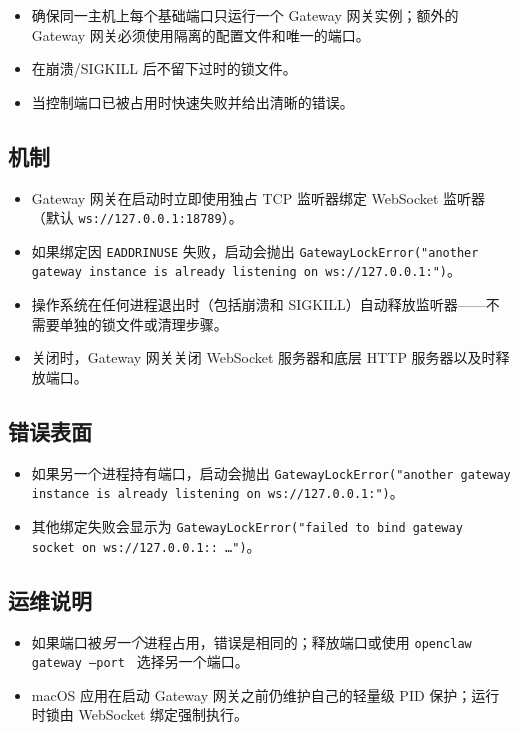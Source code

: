 \begin{itemize}
  \item 确保同一主机上每个基础端口只运行一个 Gateway 网关实例；额外的 Gateway 网关必须使用隔离的配置文件和唯一的端口。
  \item 在崩溃/SIGKILL 后不留下过时的锁文件。
  \item 当控制端口已被占用时快速失败并给出清晰的错误。
\end{itemize}


\subsection{机制}


\begin{itemize}
  \item Gateway 网关在启动时立即使用独占 TCP 监听器绑定 WebSocket 监听器（默认 \texttt{ws://127.0.0.1:18789}）。
  \item 如果绑定因 \texttt{EADDRINUSE} 失败，启动会抛出 \texttt{GatewayLockError("another gateway instance is already listening on ws://127.0.0.1:")}。
  \item 操作系统在任何进程退出时（包括崩溃和 SIGKILL）自动释放监听器——不需要单独的锁文件或清理步骤。
  \item 关闭时，Gateway 网关关闭 WebSocket 服务器和底层 HTTP 服务器以及时释放端口。
\end{itemize}


\subsection{错误表面}


\begin{itemize}
  \item 如果另一个进程持有端口，启动会抛出 \texttt{GatewayLockError("another gateway instance is already listening on ws://127.0.0.1:")}。
  \item 其他绑定失败会显示为 \texttt{GatewayLockError("failed to bind gateway socket on ws://127.0.0.1:: …")}。
\end{itemize}


\subsection{运维说明}


\begin{itemize}
  \item 如果端口被\textit{另一个}进程占用，错误是相同的；释放端口或使用 \texttt{openclaw gateway --port } 选择另一个端口。
  \item macOS 应用在启动 Gateway 网关之前仍维护自己的轻量级 PID 保护；运行时锁由 WebSocket 绑定强制执行。
\end{itemize}



